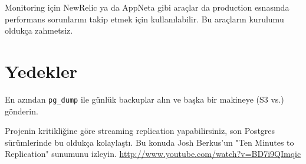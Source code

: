 \documentclass[11pt]{article}
\begin{document}
Monitoring için NewRelic ya da AppNeta gibi araçlar da production esnasında performans
sorunlarını takip etmek için kullanılabilir. Bu araçların kurulumu oldukça
zahmetsiz.


\section{Yedekler}
\label{sec-4}

En azından \texttt{pg\_dump} ile günlük backuplar alın ve başka bir makineye (S3 vs.)
gönderin.

Projenin kritikliğine göre streaming replication yapabilirsiniz, son
Postgres sürümlerinde bu oldukça kolaylaştı. Bu konuda Josh Berkus'un "Ten
Minutes to Replication" sunumunu
izleyin. \url{http://www.youtube.com/watch?v=BD7i9QImqic}
\end{document}
